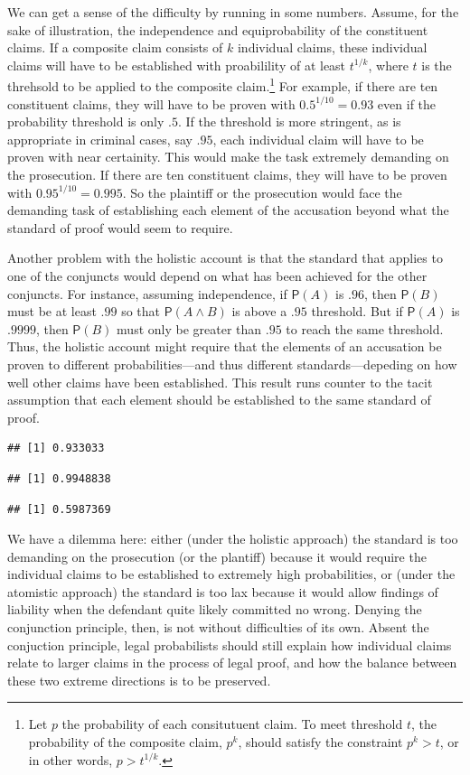 \documentclass[
  10pt,
  dvipsnames,enabledeprecatedfontcommands]{scrartcl}
\newcommand{\et}{\wedge}
\newcommand{\pr}[1]{\mathsf{P}(#1)}
\begin{document}
We can get a sense of the difficulty by running in some numbers. Assume,
for the sake of illustration, the independence and equiprobability of
the constituent claims. If a composite claim consists of \(k\)
individual claims, these individual claims will have to be established
with proabilility of at least \(t^{1/k}\), where \(t\) is the threhsold
to be applied to the composite
claim.\footnote{Let $p$ the probability of each consitutuent claim. To meet threshold $t$, the probability of the composite claim, $p^k$, should satisfy the constraint $p^k>t$, or in other words, $p>t^{1/k}$.}
For example, if there are ten constituent claims, they will have to be
proven with \(0.5^{1/10}=0.93\) even if the probability threshold is
only \(.5\). If the threshold is more stringent, as is appropriate in
criminal cases, say \(.95\), each individual claim will have to be
proven with near certainity. This would make the task extremely
demanding on the prosecution. If there are ten constituent claims, they
will have to be proven with \(0.95^{1/10}=0.995\). So the plaintiff or
the prosecution would face the demanding task of establishing each
element of the accusation beyond what the standard of proof would seem
to require.

Another problem with the holistic account is that the standard that
applies to one of the conjuncts would depend on what has been achieved
for the other conjuncts. For instance, assuming independence, if
\(\pr{A}\) is \(.96\), then \(\pr{B}\) must be at least \(.99\) so that
\(\pr{A\et B}\) is above a \(.95\) threshold. But if \(\pr{A}\) is
\(.9999\), then \(\pr{B}\) must only be greater than \(.95\) to reach
the same threshold. Thus, the holistic account might require that the
elements of an accusation be proven to different probabilities---and
thus different standards---depeding on how well other claims have been
established. This result runs counter to the tacit assumption that each
element should be established to the same standard of proof.

\begin{verbatim}
## [1] 0.933033
\end{verbatim}

\begin{verbatim}
## [1] 0.9948838
\end{verbatim}

\begin{verbatim}
## [1] 0.5987369
\end{verbatim}

We have a dilemma here: either (under the holistic approach) the
standard is too demanding on the prosecution (or the plantiff) because
it would require the individual claims to be established to extremely
high probabilities, or (under the atomistic approach) the standard is
too lax because it would allow findings of liability when the defendant
quite likely committed no wrong. Denying the conjunction principle,
then, is not without difficulties of its own. Absent the conjuction
principle, legal probabilists should still explain how individual claims
relate to larger claims in the process of legal proof, and how the
balance between these two extreme directions is to be preserved.
\end{document}
